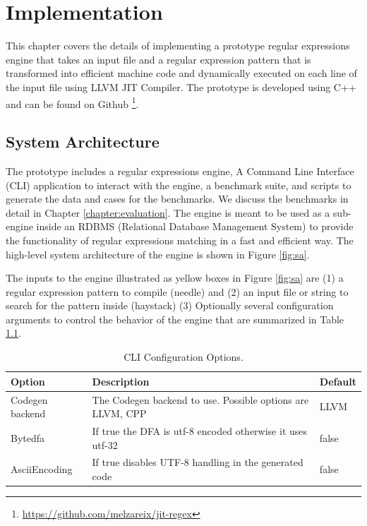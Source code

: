 \chapter{Implementation}\label{chapter:implementation}
This chapter covers the details of implementing a prototype regular expressions engine that takes an input file and a regular expression pattern that is transformed into efficient machine code and dynamically executed on each line of the input file using LLVM JIT Compiler. The prototype is developed using C++ and can be found on Github \footnote{\url{https://github.com/melzareix/jit-regex}}.

\section{System Architecture}
The prototype includes a regular expressions engine, A Command Line Interface (CLI) application to interact with the engine, a benchmark suite, and scripts to generate the data and cases for the benchmarks. We discuss the benchmarks in detail in Chapter \ref{chapter:evaluation}. The engine is meant to be used as a sub-engine inside an RDBMS (Relational Database Management System) to provide the functionality of regular expressions matching in a fast and efficient way. The high-level system architecture of the engine is shown in Figure \ref{fig:sa}.

The inputs to the engine illustrated as yellow boxes in Figure \ref{fig:sa} are (1) a regular expression pattern to compile (needle) and (2) an input file or string to search for the pattern inside (haystack) (3) Optionally several configuration arguments to control the behavior of the engine that are summarized in Table \ref{tab:cliconf}. 

{\renewcommand{\arraystretch}{1.5}%
\begin{table}[htpb]
\centering
\begin{adjustbox}{width=\textwidth,center=\textwidth}
\small
\begin{tabular}{|l|l|l|}
\hline
Option        & Description & Default  \\
\hline
Codegen backend & The Codegen backend to use. Possible options are {LLVM, CPP} & LLVM\\
\hline
Bytedfa & If true the DFA is utf-8 encoded otherwise it uses utf-32 & false \\
\hline
AsciiEncoding & If true disables UTF-8 handling in the generated code & false \\
\hline
\end{tabular}
\end{adjustbox}
\caption[CLI Configuration Options]{CLI Configuration Options.}\label{tab:cliconf}
\end{table}}

